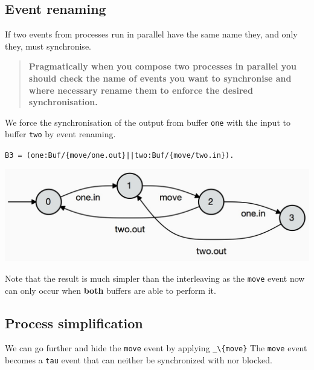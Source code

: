 \documentclass[]{article}
\begin{document}
\subsection{Event renaming}
If two events from processes run in parallel have the same name they, and only they,  must synchronise.
\begin{quote}
{\bf Pragmatically when you compose two processes in parallel you should check the name of events   you want to   synchronise and where necessary rename them to enforce the desired synchronisation.}
\end{quote}


We force the synchronisation of the output from buffer \verb$one$ with the input to buffer \verb$two$ by event renaming.


\noindent\begin{center}\verb$B3 = (one:Buf/{move/one.out}||two:Buf/{move/two.in}).$\end{center}

\noindent\begin{center} \includegraphics[scale=0.15]{B3.jpg} \end{center}

Note that the result is much simpler than the interleaving as the \verb$move$ event now can only occur when {\bf both} buffers are able to perform it.



\subsection{Process simplification}
We can go further and hide the \verb$move$ event  by applying \verb$_\{move}$ The \verb$move$ event  becomes a \verb$tau$ event that can neither  be synchronized with nor blocked.
\end{document}
